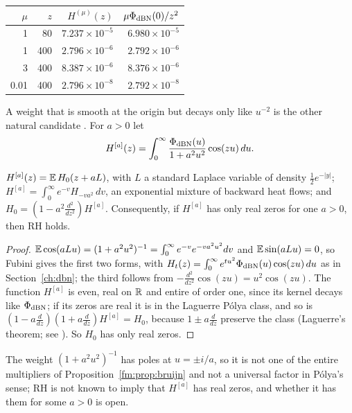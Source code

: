 \begin{center}
\small
\begin{tabular}{rrrr}
\toprule
$\mu$ & $z$ & $H^{(\mu)}(z)$ & $\mu\Phi_{\rm dBN}(0)/z^2$\\
\midrule
1 & 80 & $7.237\times10^{-5}$ & $6.980\times10^{-5}$\\
1 & 400 & $2.796\times10^{-6}$ & $2.792\times10^{-6}$\\
3 & 400 & $8.387\times10^{-6}$ & $8.376\times10^{-6}$\\
0.01 & 400 & $2.796\times10^{-8}$ & $2.792\times10^{-8}$\\
\bottomrule
\end{tabular}
\end{center}

A weight that is smooth at the origin but decays only like $u^{-2}$ is the other natural candidate \cite{PolsonRXi26}. For $a>0$ let
\[
H^{[a]}(z)=\int_0^\infty\frac{\Phi_{\rm dBN}(u)}{1+a^2u^2}\cos(zu)\,du .
\]
\begin{proposition}\label{xg:prop:laplace}
$H^{[a]}(z)=\mathbb{E}\,H_0(z+aL)$, with $L$ a standard Laplace variable of density $\frac12e^{-|y|}$; $H^{[a]}=\int_0^\infty e^{-v}H_{-va^2}\,dv$, an exponential mixture of backward heat flows; and $H_0=(1-a^2\frac{d^2}{dz^2})H^{[a]}$. Consequently, if $H^{[a]}$ has only real zeros for one $a>0$, then RH holds.
\end{proposition}
\begin{proof}
$\mathbb{E}\cos(aLu)=(1+a^2u^2)^{-1}=\int_0^\infty e^{-v}e^{-va^2u^2}dv$ and $\mathbb{E}\sin(aLu)=0$, so Fubini gives the first two forms, with $H_t(z)=\int_0^\infty e^{tu^2}\Phi_{\rm dBN}(u)\cos(zu)\,du$ as in Section~\ref{ch:dbn}; the third follows from $-\frac{d^2}{dz^2}\cos(zu)=u^2\cos(zu)$. The function $H^{[a]}$ is even, real on $\mathbb{R}$ and entire of order one, since its kernel decays like $\Phi_{\rm dBN}$; if its zeros are real it is in the Laguerre P\'olya class, and so is $(1-a\frac d{dz})(1+a\frac d{dz})H^{[a]}=H_0$, because $1\pm a\frac d{dz}$ preserve the class (Laguerre's theorem; see \cite{Levin64}). So $H_0$ has only real zeros.
\end{proof}
The weight $(1+a^2u^2)^{-1}$ has poles at $u=\pm i/a$, so it is not one of the entire multipliers of Proposition~\ref{fm:prop:bruijn} and not a universal factor in P\'olya's sense; RH is not known to imply that $H^{[a]}$ has real zeros, and whether it has them for some $a>0$ is open.


